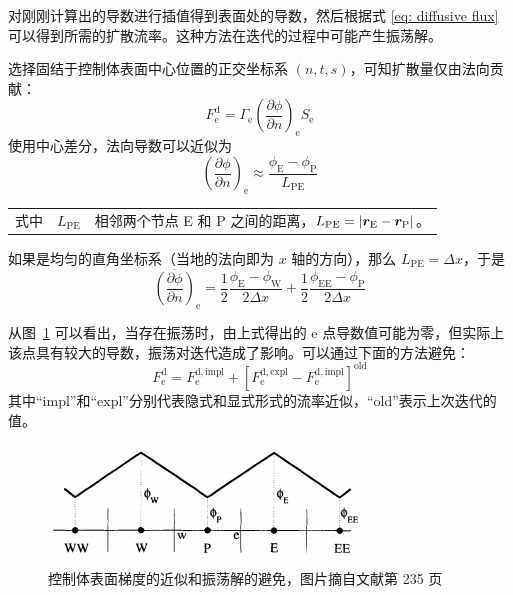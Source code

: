 对刚刚计算出的导数进行插值得到表面处的导数，然后根据式 \eqref{eq: diffusive flux} 可以得到所需的扩散流率。这种方法在迭代的过程中可能产生振荡解。

选择固结于控制体表面中心位置的正交坐标系 $(n,t,s)$，可知扩散量仅由法向贡献：
\begin{equation}\label{eq: diffusive flux of local coordinate}
	F_{\mathrm{e}}^{\mathrm{d}} = \varGamma_{\mathrm{e}}\left(\frac{\partial\phi}{\partial n}\right)_{\mathrm{e}}S_{\mathrm{e}}
\end{equation}
使用中心差分，法向导数可以近似为%
\begin{equation}
	\left(\frac{\partial\phi}{\partial n}\right)_{\mathrm{e}} \approx
	\frac{\phi_{\mathrm{E}}-\phi_{\mathrm{P}}}{L_{\mathrm{PE}}}
\end{equation}
\begin{tabularx}{\textwidth}{@{}l@{\quad}r@{——}X@{}}
	式中 & $L_{\mathrm{PE}}$ & 相邻两个节点 E 和 P 之间的距离，$L_{\mathrm{PE}} = \lvert\bm{r}_{\mathrm{E}}-\bm{r}_{\mathrm{P}}\vert$。
\end{tabularx}\vspace{3.15bp}
如果是均匀的直角坐标系（当地的法向即为 $x$ 轴的方向），那么 $L_{\mathrm{PE}}=\Delta x$，于是
\begin{equation}
	\overline{\left(\frac{\partial\phi}{\partial n}\right)}_{\mathrm{e}} =
	\frac12\frac{\phi_{\mathrm{E}}-\phi_{\mathrm{W}}}{2\Delta x} +
	\frac12\frac{\phi_{\mathrm{EE}}-\phi_{\mathrm{P}}}{2\Delta x}
\end{equation}

从图~\ref{fig: approximation} 可以看出，当存在振荡时，由上式得出的 e 点导数值可能为零，但实际上该点具有较大的导数，振荡对迭代造成了影响。可以通过下面的方法避免：%
\begin{equation}
	F_{\mathrm{e}}^{\mathrm{d}} = F_{\mathrm{e}}^{\mathrm{d,impl}} +
	[F_{\mathrm{e}}^{\mathrm{d,expl}} - F_{\mathrm{e}}^{\mathrm{d,impl}}]^{\mathrm{old}}
\end{equation}
其中“impl”和“expl”分别代表隐式和显式形式的流率近似，“old”表示上次迭代的值。

\begin{figure}
	\centering
	\includegraphics[scale=.8]{figs/approximation}
	\caption{控制体表面梯度的近似和振荡解的避免，图片摘自文献第 235 页}
	\label{fig: approximation}
\end{figure}

